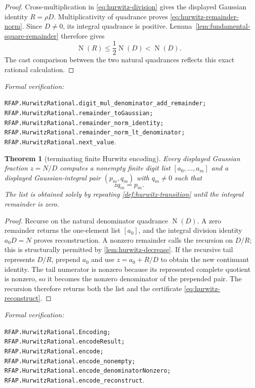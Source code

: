 \documentclass[11pt]{article}
\newtheorem{theorem}{Theorem}[section]
\newcommand{\Norm}[1]{\operatorname{N}\!\left(#1\right)}
\newcommand{\leanref}[1]{\par\smallskip\noindent
  \emph{Formal verification:}\par\nobreak
  {\raggedright\nolinkurl{#1}.\par}}
\begin{document}
\begin{proof}
Cross-multiplication in \eqref{eq:hurwitz-division} gives the displayed
Gaussian identity $R=\rho D$.  Multiplicativity of quadrance proves
\eqref{eq:hurwitz-remainder-norm}.  Since $D\ne0$, its integral quadrance is
positive.  Lemma~\ref{lem:fundamental-square-remainder} therefore gives
\[
       \Norm R\le\frac12\Norm D<\Norm D.
\]
The cast comparison between the two natural quadrances reflects this exact
rational calculation.
\end{proof}

\leanref{RFAP.HurwitzRational.digit_mul_denominator_add_remainder;
RFAP.HurwitzRational.remainder_toGaussian;
RFAP.HurwitzRational.remainder_norm_identity;
RFAP.HurwitzRational.remainder_norm_lt_denominator;
RFAP.HurwitzRational.next_value}

\begin{theorem}[terminating finite Hurwitz encoding]
\label{thm:finite-hurwitz-encoding}
Every displayed Gaussian fraction $z=N/D$ computes a nonempty finite digit
list $[a_0,\ldots,a_m]$ and a displayed Gaussian-integral pair $(p_m,q_m)$
with $q_m\ne0$ such that
\begin{equation}
\label{eq:hurwitz-reconstruct}
                         zq_m=p_m.
\end{equation}
The list is obtained solely by repeating \cref{def:hurwitz-transition} until
the integral remainder is zero.
\end{theorem}

\begin{proof}
Recurse on the natural denominator quadrance $\Norm D$.  A zero remainder
returns the one-element list $[a_0]$, and the integral division identity
$a_0D=N$ proves reconstruction.  A nonzero remainder calls the recursion on
$D/R$; this is structurally permitted by \cref{lem:hurwitz-decrease}.  If the
recursive tail represents $D/R$, prepend $a_0$ and use
$z=a_0+R/D$ to obtain the new continuant identity.  The tail numerator is
nonzero because its represented complete quotient is nonzero, so it becomes
the nonzero denominator of the prepended pair.  The recursion therefore
returns both the list and the certificate \eqref{eq:hurwitz-reconstruct}.
\end{proof}

\leanref{RFAP.HurwitzRational.Encoding;
RFAP.HurwitzRational.encodeResult;
RFAP.HurwitzRational.encode;
RFAP.HurwitzRational.encode_nonempty;
RFAP.HurwitzRational.encode_denominatorNonzero;
RFAP.HurwitzRational.encode_reconstruct}
\end{document}
